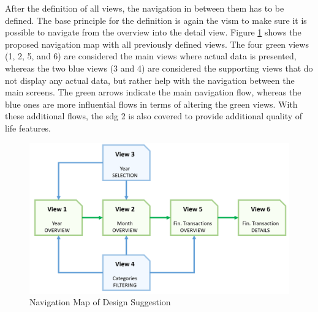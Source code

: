 After the definition of all views, the navigation in between them has to be defined. The base principle for the definition is again the \gls{vism} to make sure it is possible to navigate from the overview into the detail view. Figure \ref{fig:navigationmap} shows the proposed navigation map with all previously defined views. The four green views (1, 2, 5, and 6) are considered the main views where actual data is presented, whereas the two blue views (3 and 4) are considered the supporting views that do not display any actual data, but rather help with the navigation between the main screens. The green arrows indicate the main navigation flow, whereas the blue ones are more influential flows in terms of  altering the green views. With these additional flows, the \gls{sdg} 2 is also covered to provide additional quality of life features. \newline
\begin{figure}[h]
	\begin{center}
		\includegraphics[width=14cm]{03_Figures/07_Suggestion/NavigationMap.png}
		\caption{Navigation Map of Design Suggestion}
		\label{fig:navigationmap}
	\end{center}
\end{figure}

